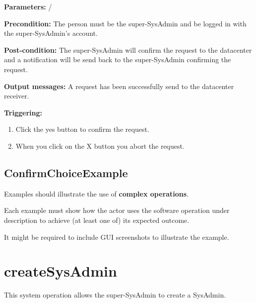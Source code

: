 \begin{description}

\item \textbf{Parameters:} /
\item \textbf{Precondition:} The person must be the super-SysAdmin and be logged
in with the super-SysAdmin's account.
\item \textbf{Post-condition:} The super-SysAdmin will confirm the request to
the datacenter and a notification will be send back to the super-SysAdmin
confirming the request.
\item \textbf{Output messages:} A request has been successfully send to the
datacenter receiver.
\item \textbf{Triggering:} 
\begin{enumerate}
\item Click the yes button to confirm the request.
\item When you click on the X button you abort the request.
\end{enumerate}

 
\end{description}

\subsection{ConfirmChoiceExample}
Examples should illustrate the use of \textbf{complex operations}.

Each example must show how the actor uses the software operation under
description to achieve (at least one of) its expected outcome.

It might be required to include GUI screenshots to illustrate the example.




\section{createSysAdmin}
\label{operation:createSysAdmin}
This system operation allows the super-SysAdmin to create a SysAdmin.

